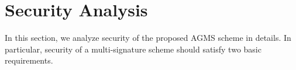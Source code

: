 \documentclass[journal]{IEEEtran}
\begin{document}



\section{Security Analysis}
In this section, we analyze security of the proposed AGMS scheme in details. In particular, security of a multi-signature scheme should satisfy two basic requirements.
\end{document}
